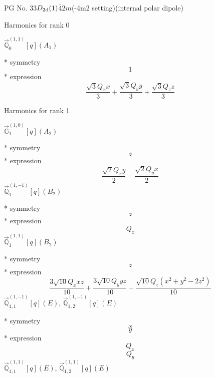 \documentclass[fleqn,8pt]{jsarticle}
\begin{document}
\setcounter{MaxMatrixCols}{32}

\renewcommand{\tablename}{Table~}
\renewcommand{\figurename}{Figure~}
\begin{center}
\LARGE
PG No. 33\quad$D_{\rm 2d}(1)$\quad$\bar{4}2m$\quad(-4m2 setting)\quad[ tetragonal ] (internal polar dipole)
\end{center}

\noindent * Harmonics for rank 0

\noindent\quad $\vec{\mathbb{Q}}_{0}^{(1,1)}[q](A_{1})$

\noindent\quad ** symmetry
\begin{dmath*}
1
\end{dmath*}
\noindent\quad ** expression
\begin{dmath*}
\frac{\sqrt{3} Q_{x} x}{3} + \frac{\sqrt{3} Q_{y} y}{3} + \frac{\sqrt{3} Q_{z} z}{3}
\end{dmath*}

\noindent * Harmonics for rank 1

\noindent\quad $\vec{\mathbb{G}}_{1}^{(1,0)}[q](A_{2})$

\noindent\quad ** symmetry
\begin{dmath*}
z
\end{dmath*}
\noindent\quad ** expression
\begin{dmath*}
\frac{\sqrt{2} Q_{x} y}{2} - \frac{\sqrt{2} Q_{y} x}{2}
\end{dmath*}
\noindent\quad $\vec{\mathbb{Q}}_{1}^{(1,-1)}[q](B_{2})$

\noindent\quad ** symmetry
\begin{dmath*}
z
\end{dmath*}
\noindent\quad ** expression
\begin{dmath*}
Q_{z}
\end{dmath*}
\noindent\quad $\vec{\mathbb{Q}}_{1}^{(1,1)}[q](B_{2})$

\noindent\quad ** symmetry
\begin{dmath*}
z
\end{dmath*}
\noindent\quad ** expression
\begin{dmath*}
\frac{3 \sqrt{10} Q_{x} x z}{10} + \frac{3 \sqrt{10} Q_{y} y z}{10} - \frac{\sqrt{10} Q_{z} \left(x^{2} + y^{2} - 2 z^{2}\right)}{10}
\end{dmath*}
\noindent\quad $\vec{\mathbb{Q}}_{1,1}^{(1,-1)}[q](E)$, $\vec{\mathbb{Q}}_{1,2}^{(1,-1)}[q](E)$

\noindent\quad ** symmetry
\begin{dmath*}
x
\end{dmath*}
\begin{dmath*}
y
\end{dmath*}
\noindent\quad ** expression
\begin{dmath*}
Q_{x}
\end{dmath*}
\begin{dmath*}
Q_{y}
\end{dmath*}
\noindent\quad $\vec{\mathbb{Q}}_{1,1}^{(1,1)}[q](E)$, $\vec{\mathbb{Q}}_{1,2}^{(1,1)}[q](E)$
\end{document}
